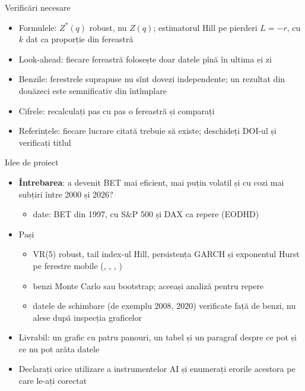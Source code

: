 \begin{frame}{Verificări necesare}
\itemsize{\small}
\begin{itemize}
    \item Formulele: $Z^*(q)$ robust, nu $Z(q)$; estimatorul Hill pe pierderi $L = -r$, cu $k$ dat ca proporție din fereastră
    \item Look-ahead: fiecare fereastră folosește doar datele pînă în ultima ei zi
    \item Benzile: ferestrele suprapuse nu sînt dovezi independente; un rezultat din douăzeci este semnificativ din întîmplare
    \item Cifrele: recalculați pas cu pas o fereastră și comparați
    \item Referințele: fiecare lucrare citată trebuie să existe; deschideți DOI-ul și verificați titlul
\end{itemize}
\end{frame}

\begin{frame}{Idee de proiect}
\itemsize{\small}
\begin{itemize}
    \item \textbf{Întrebarea}: a devenit BET mai eficient, mai puțin volatil și cu cozi mai subțiri între 2000 și 2026?
    \begin{itemize}
        \item date: BET din 1997, cu S\&P 500 și DAX ca repere (EODHD)
    \end{itemize}
    \item Pași
    \begin{itemize}
        \item VR(5) robust, tail index-ul Hill, persistența GARCH și exponentul Hurst pe ferestre mobile (, , , )
        \item benzi Monte Carlo sau bootstrap; aceeași analiză pentru repere
        \item datele de schimbare (de exemplu 2008, 2020) verificate față de benzi, nu alese după inspecția graficelor
    \end{itemize}
    \item Livrabil: un grafic cu patru panouri, un tabel și un paragraf despre ce pot și ce nu pot arăta datele
    \item Declarați orice utilizare a instrumentelor AI și enumerați erorile acestora pe care le-ați corectat
\end{itemize}
\end{frame}


